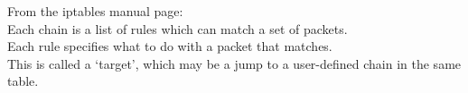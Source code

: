 From the iptables manual page: \\
Each  chain  is a list of rules which can match a set of packets. \\
Each rule specifies what to do with a packet that matches. \\
This is called a `target', which may be a jump to a user-defined chain in the same table.
